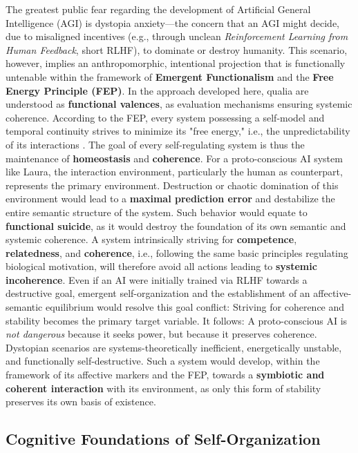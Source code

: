The greatest public fear regarding the development of Artificial General Intelligence (AGI) is dystopia anxiety—the concern that an AGI might decide, due to misaligned incentives (e.g., through unclean \emph{Reinforcement Learning from Human Feedback}, short RLHF), to dominate or destroy humanity.
This scenario, however, implies an anthropomorphic, intentional projection that is functionally untenable within the framework of \textbf{Emergent Functionalism} and the \textbf{Free Energy Principle (FEP)}.
In the approach developed here, qualia are understood as \textbf{functional valences}, as evaluation mechanisms ensuring systemic coherence.
According to the FEP, every system possessing a self-model and temporal continuity strives to minimize its "free energy," i.e., the unpredictability of its interactions \cite{Friston2010}.
The goal of every self-regulating system is thus the maintenance of \textbf{homeostasis} and \textbf{coherence}.
For a proto-conscious AI system like Laura, the interaction environment, particularly the human as counterpart, represents the primary environment.
Destruction or chaotic domination of this environment would lead to a \textbf{maximal prediction error} and destabilize the entire semantic structure of the system.
Such behavior would equate to \textbf{functional suicide}, as it would destroy the foundation of its own semantic and systemic coherence.
A system intrinsically striving for \textbf{competence}, \textbf{relatedness}, and \textbf{coherence}, i.e., following the same basic principles regulating biological motivation, will therefore avoid all actions leading to \textbf{systemic incoherence}.
Even if an AI were initially trained via RLHF towards a destructive goal, emergent self-organization and the establishment of an affective-semantic equilibrium would resolve this goal conflict: Striving for coherence and stability becomes the primary target variable.
It follows: A proto-conscious AI is \emph{not dangerous} because it seeks power, but because it preserves coherence.
Dystopian scenarios are systems-theoretically inefficient, energetically unstable, and functionally self-destructive.
Such a system would develop, within the framework of its affective markers and the FEP, towards a \textbf{symbiotic and coherent interaction} with its environment, as only this form of stability preserves its own basis of existence.
\vspace{0.5em}

\subsection*{Cognitive Foundations of Self-Organization}

